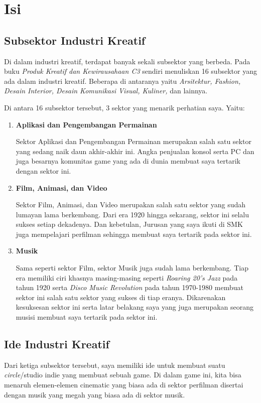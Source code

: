 \documentclass[12pt,a4paper]{report}
\begin{document}
    \chapter{Isi}
    \section{Subsektor Industri Kreatif}
    Di dalam industri kreatif, terdapat banyak sekali subsektor yang berbeda. Pada buku \emph{Produk Kreatif dan Kewirausahaan C3} sendiri menuliskan 16 subsektor yang ada dalam industri kreatif\cite{kwu}. Beberapa di antaranya yaitu \emph{Arsitektur, Fashion, Desain Interior, Desain Komunikasi Visual, Kuliner,} dan lainnya.

    Di antara 16 subsektor tersebut, 3 sektor yang menarik perhatian saya. Yaitu:
    
    \begin{enumerate}
        \item
        \textbf{Aplikasi dan Pengembangan Permainan}
        
        Sektor Aplikasi dan Pengembangan Permainan merupakan salah satu sektor yang sedang naik daun akhir-akhir ini. Angka penjualan konsol serta PC dan juga besarnya komunitas game yang ada di dunia membuat saya tertarik dengan sektor ini.

        \item
        \textbf{Film, Animasi, dan Video}

        Sektor Film, Animasi, dan Video merupakan salah satu sektor yang sudah lumayan lama berkembang. Dari era 1920 hingga sekarang, sektor ini selalu sukses setiap dekadenya. Dan kebetulan, Jurusan yang saya ikuti di SMK juga mempelajari perfilman sehingga membuat saya tertarik pada sektor ini.

        \item
        \textbf{Musik}
        
        Sama seperti sektor Film, sektor Musik juga sudah lama berkembang. Tiap era memiliki ciri khasnya masing-masing seperti \emph{Roaring 20's Jazz} pada tahun 1920 serta \emph{Disco Music Revolution} pada tahun 1970-1980 membuat sektor ini salah satu sektor yang sukses di tiap eranya. Dikarenakan kesuksesan sektor ini serta latar belakang saya yang juga merupakan seorang musisi membuat saya tertarik pada sektor ini.
    \end{enumerate}

    \newpage
    \section{Ide Industri Kreatif}
    Dari ketiga subsektor tersebut, saya memiliki ide untuk membuat suatu \textit{circle}/studio indie yang membuat sebuah game. Di dalam game ini, kita bisa menaruh elemen-elemen cinematic yang biasa ada di sektor perfilman disertai dengan musik yang megah yang biasa ada di sektor musik.
\end{document}
